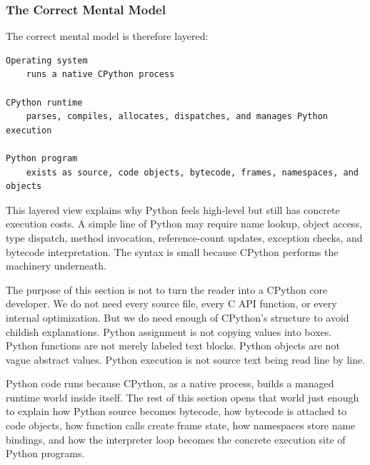 \subsubsection{The Correct Mental Model}

The correct mental model is therefore layered:

\begin{verbatim}
Operating system
    runs a native CPython process

CPython runtime
    parses, compiles, allocates, dispatches, and manages Python execution

Python program
    exists as source, code objects, bytecode, frames, namespaces, and objects
\end{verbatim}

This layered view explains why Python feels high-level but still has concrete execution costs. A simple line of Python may require name lookup, object access, type dispatch, method invocation, reference-count updates, exception checks, and bytecode interpretation. The syntax is small because CPython performs the machinery underneath.

The purpose of this section is not to turn the reader into a CPython core developer. We do not need every source file, every C API function, or every internal optimization. But we do need enough of CPython's structure to avoid childish explanations. Python assignment is not copying values into boxes. Python functions are not merely labeled text blocks. Python objects are not vague abstract values. Python execution is not source text being read line by line.

Python code runs because CPython, as a native process, builds a managed runtime world inside itself. The rest of this section opens that world just enough to explain how Python source becomes bytecode, how bytecode is attached to code objects, how function calls create frame state, how namespaces store name bindings, and how the interpreter loop becomes the concrete execution site of Python programs.